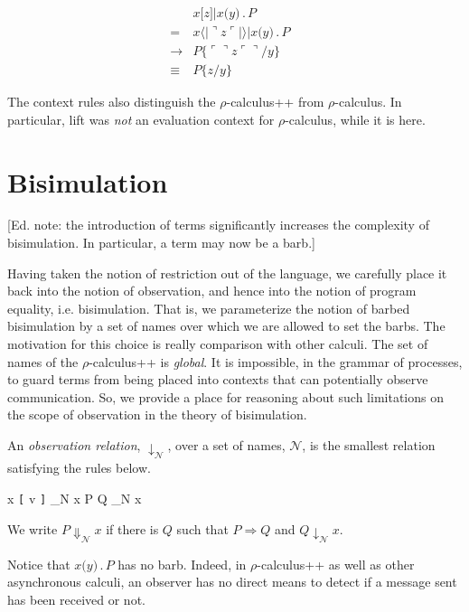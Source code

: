 \documentclass[]{entcs}
\newcommand{\lliftb}{\langle\!|}
\newcommand{\rliftb}{|\!\rangle}
\newcommand{\lpquote}{\ulcorner}
\newcommand{\rpquote}{\urcorner}
\newcommand{\id}[1]{\texttt{#1}}
\newcommand{\juxtap}{\mathbin{\id{|}}}
\newcommand{\concat}{\mathbin{.}}
\newcommand{\scong}{\mathbin{\equiv}}
\newcommand{\nameeq}{\mathbin{\equiv_N}}
\newcommand{\binpar}[2]{#1 \juxtap #2}
\newcommand{\outputp}[2]{#1 \id{[} #2 \id{]}}
\newcommand{\prefix}[3]{#1 \id{(} #2 \id{)} \concat #3}
\newcommand{\lift}[2]{#1 \lliftb #2 \rliftb}
\newcommand{\quotep}[1]{\lpquote #1 \rpquote}
\newcommand{\dropn}[1]{\rpquote #1 \lpquote}
\newcommand{\substn}[2]{\id{\{} #1 / #2 \id{\}}}
\newcommand{\red}{\rightarrow}
\newcommand{\wred}{\Rightarrow}
\newcommand{\rhoc}{$\rho$-calculus}
\newcommand{\rhocpp}{$\rho$-calculus++}
\begin{document}
\begin{eqnarray}
	& {x}\id{[}{z}\id{]} \juxtap x \id{(}y\id{)} \concat P & \nonumber\\
	= 
	& \lift{x}{\dropn{z}} \juxtap x \id{(}y\id{)} \concat P & \nonumber\\
	\red 
	& P \substn{\quotep{\dropn{z}}}{y} & \nonumber\\
	\scong & P \substn{z}{y} & \nonumber
\end{eqnarray}

The context rules also distinguish the {\rhocpp} from {\rhoc}. In
particular, lift was \emph{not} an evaluation context for {\rhoc},
while it is here.

\section{Bisimulation}

[Ed. note: the introduction of terms significantly increases the
complexity of bisimulation. In particular, a term may now be a barb.]

Having taken the notion of restriction out of the language, we
carefully place it back into the notion of observation, and hence into
the notion of program equality, i.e. bisimulation. That is, we
parameterize the notion of barbed bisimulation by a set of names over
which we are allowed to set the barbs. The motivation for this choice
is really comparison with other calculi. The set of names of the
{\rhocpp} is \textit{global}. It is impossible, in the grammar of
processes, to guard terms from being placed into contexts that can
potentially observe communication. So, we provide a place for
reasoning about such limitations on the scope of observation in the
theory of bisimulation.

\begin{definition}
An \emph{observation relation}, $\downarrow_{\mathcal N}$, over a set
of names, $\mathcal N$, is the smallest relation satisfying the rules
below.

\infrule[Out-barb]{y \in {\mathcal N}, \; x \nameeq y}
		  {\outputp{x}{v} \downarrow_{\mathcal N} x}
		  {\binpar{P}{Q} \downarrow_{\mathcal N} x}

We write $P \Downarrow_{\mathcal N} x$ if there is $Q$ such that 
$P \wred Q$ and $Q \downarrow_{\mathcal N} x$.
\end{definition}

Notice that $\prefix{x}{y}{P}$ has no barb.  Indeed, in {\rhocpp} as well
as other asynchronous calculi, an observer has no direct means to
detect if a message sent has been received or not.
\end{document}
